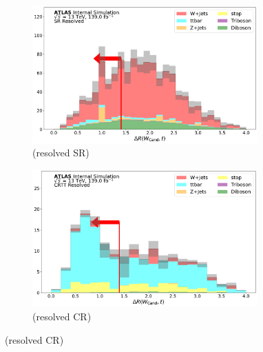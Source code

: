     \begin{figure}[htbp]\ContinuedFloat
   \begin{subfigure}{0.45\textwidth}
     \includegraphics[width = 0.95\textwidth]{Figures/App_SR_CR_distributions/SR1L_Resolved/dRWl_N_1.pdf}
    \caption{\drWl (resolved SR)}
     \end{subfigure}
    \begin{subfigure}{0.45\textwidth}
     \includegraphics[width = 0.95\textwidth]{Figures/App_SR_CR_distributions/CRTT_Resolved/dRWl_N_1.pdf}
     \caption{\drWl (resolved \ttbar CR)}
     \end{subfigure}


\end{figure}
